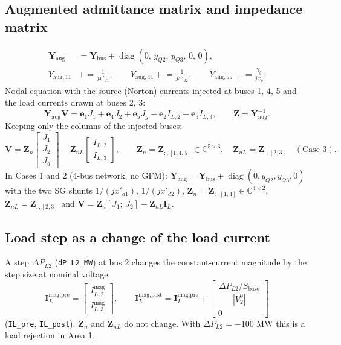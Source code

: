 \documentclass[11pt,a4paper]{article}
\numberwithin{equation}{section}
\begin{document}
\subsection{Augmented admittance matrix and impedance matrix}
\begin{align}
\bm Y_{\text{aug}} &= \bm Y_{\text{bus}} + \operatorname{diag}(0,\,y_{Q2},\,y_{Q3},\,0,\,0),\\
Y_{\text{aug},11} &\mathrel{+}= \frac{1}{jx'_{d1}},\qquad Y_{\text{aug},44} \mathrel{+}= \frac{1}{jx'_{d2}},\qquad Y_{\text{aug},55} \mathrel{+}= \frac{\gamma_g}{jx_g} .
\end{align}
Nodal equation with the source (Norton) currents injected at buses 1, 4, 5 and the load currents drawn at buses 2, 3:
\begin{equation}
\bm Y_{\text{aug}}\bm V = \bm e_1 J_1 + \bm e_4 J_2 + \bm e_5 J_g - \bm e_2 I_{L,2} - \bm e_3 I_{L,3},\qquad \bm Z = \bm Y_{\text{aug}}^{-1}.
\end{equation}
Keeping only the columns of the injected buses:
\begin{equation}
\boxed{\bm V = \bm Z_n \begin{bmatrix} J_1\\ J_2\\ J_g\end{bmatrix} - \bm Z_{nL}\begin{bmatrix} I_{L,2}\\ I_{L,3}\end{bmatrix},\qquad
\bm Z_n = \bm Z_{:,[1,4,5]}\in\mathbb C^{5\times 3},\quad \bm Z_{nL} = \bm Z_{:,[2,3]}\quad(\text{Case 3}).}
\end{equation}
In Cases 1 and 2 (4-bus network, no GFM): $\bm Y_{\text{aug}} = \bm Y_{\text{bus}} + \operatorname{diag}(0,y_{Q2},y_{Q3},0)$ with the two SG shunts $1/(jx'_{d1})$, $1/(jx'_{d2})$, $\bm Z_n = \bm Z_{:,[1,4]}\in\mathbb C^{4\times 2}$, $\bm Z_{nL} = \bm Z_{:,[2,3]}$ and $\bm V = \bm Z_n[J_1;\,J_2] - \bm Z_{nL}\bm I_L$.

\subsection{Load step as a change of the load current}
A step $\Delta P_{L2}$ (\texttt{dP\_L2\_MW}) at bus 2 changes the constant-current magnitude by the step size at nominal voltage:
\begin{equation}
\bm I_L^{\text{mag,pre}} = \begin{bmatrix} I_{L,2}^{\text{mag}}\\ I_{L,3}^{\text{mag}}\end{bmatrix},\qquad
\bm I_L^{\text{mag,post}} = \bm I_L^{\text{mag,pre}} + \begin{bmatrix} \dfrac{\Delta P_{L2}/S_{\text{base}}}{|V_2^0|}\\ 0\end{bmatrix}
\end{equation}
(\texttt{IL\_pre}, \texttt{IL\_post}). $\bm Z_n$ and $\bm Z_{nL}$ do not change. With $\Delta P_{L2}=-100$ MW this is a load rejection in Area 1.
\end{document}
